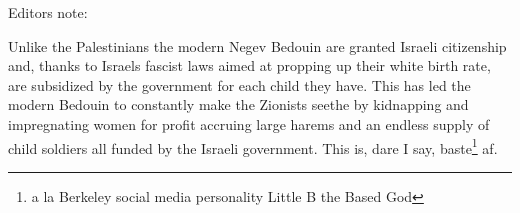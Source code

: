 \documentclass{article}
\begin{document}
\hfill \break
\noindent Editors note:

Unlike the Palestinians the modern Negev Bedouin are granted Israeli citizenship and, thanks to Israels fascist laws aimed at propping up their white birth rate, are subsidized by the government for each child they have. This has led the modern Bedouin to constantly make the Zionists seethe by kidnapping and impregnating women for profit accruing large harems and an endless supply of child soldiers all funded by the Israeli government. This is, dare I say, baste\footnote{a la Berkeley social media personality Little B the Based God} af.
\end{document}
